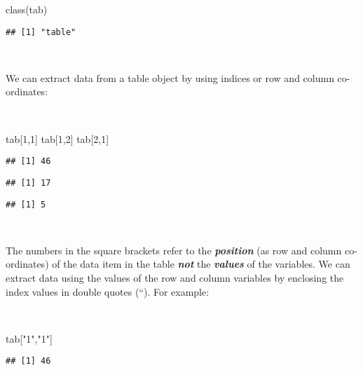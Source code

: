 \documentclass[
  12pt,
  a4paper]{book}
\newenvironment{Shaded}{\begin{snugshade}}{\end{snugshade}}
\newcommand{\DecValTok}[1]{\textcolor[rgb]{0.00,0.00,0.81}{#1}}
\newcommand{\FunctionTok}[1]{\textcolor[rgb]{0.00,0.00,0.00}{#1}}
\newcommand{\NormalTok}[1]{#1}
\newcommand{\StringTok}[1]{\textcolor[rgb]{0.31,0.60,0.02}{#1}}
\begin{document}
\begin{Shaded}
\begin{Highlighting}[]
\FunctionTok{class}\NormalTok{(tab)}
\end{Highlighting}
\end{Shaded}

\begin{verbatim}
## [1] "table"
\end{verbatim}

~

We can extract data from a table object by using indices or row and column co-ordinates:

~

\begin{Shaded}
\begin{Highlighting}[]
\NormalTok{tab[}\DecValTok{1}\NormalTok{,}\DecValTok{1}\NormalTok{]}
\NormalTok{tab[}\DecValTok{1}\NormalTok{,}\DecValTok{2}\NormalTok{]}
\NormalTok{tab[}\DecValTok{2}\NormalTok{,}\DecValTok{1}\NormalTok{]}
\end{Highlighting}
\end{Shaded}

\begin{verbatim}
## [1] 46
\end{verbatim}

\begin{verbatim}
## [1] 17
\end{verbatim}

\begin{verbatim}
## [1] 5
\end{verbatim}

~

The numbers in the square brackets refer to the \textbf{\emph{position}} (as row and column co-ordinates) of the data item in the table \textbf{\emph{not}} the \textbf{\emph{values}} of the variables. We can extract data using the values of the row and column variables by enclosing the index values in double quotes (``). For example:

~

\begin{Shaded}
\begin{Highlighting}[]
\NormalTok{tab[}\StringTok{"1"}\NormalTok{,}\StringTok{"1"}\NormalTok{]}
\end{Highlighting}
\end{Shaded}

\begin{verbatim}
## [1] 46
\end{verbatim}
\end{document}

